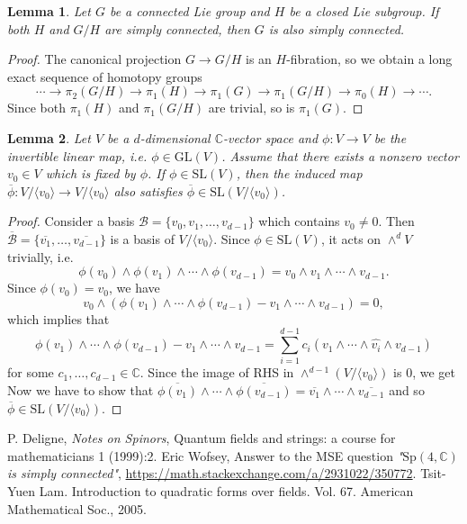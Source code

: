 \documentclass{article}
\newtheorem{lemma}{Lemma}
\newcommand{\SL}{\mathrm{SL}}
\newcommand{\GL}{\mathrm{GL}}
\newcommand{\Sp}{\mathrm{Sp}}
\begin{document}
\begin{lemma}
\label{simply}
Let $G$ be a connected Lie group and $H$ be a closed Lie subgroup. If both $H$ and $G/H$ are simply connected, then $G$ is also simply connected. 
\end{lemma}
\begin{proof}
The canonical projection $G\to G/H$ is an $H$-fibration, so we obtain a long exact sequence of homotopy groups
$$
\cdots \to \pi_{2}(G/H)\to \pi_{1}(H) \to \pi_{1}(G) \to \pi_{1}(G/H) \to \pi_{0}(H) \to \cdots. 
$$
Since both $\pi_{1}(H)$ and $\pi_{1}(G/H)$ are trivial, so is $\pi_{1}(G)$. 
\end{proof}

\begin{lemma}
\label{det}
Let $V$ be a $d$-dimensional $\mathbb{C}$-vector space and $\phi:V\to V$ be the invertible linear map, i.e. $\phi\in \GL(V)$. Assume that there exists a nonzero vector $v_{0}\in V$ which is fixed by $\phi$. 
If $\phi\in \SL(V)$, then the induced map $\overline{\phi}:V/\langle v_{0}\rangle \to V/\langle v_{0}\rangle$ also satisfies $\overline{\phi}\in \SL(V/\langle v_{0}\rangle)$. 
\end{lemma}
\begin{proof}
Consider a basis $\mathcal{B} = \{v_{0}, v_{1}, \dots, v_{d-1}\}$ which contains $v_{0}\neq 0$. 
Then $\overline{\mathcal{B}} = \{\overline{v_{1}}, \dots, \overline{v_{d-1}}\}$ is a basis of $V/\langle v_{0}\rangle$. 
Since $\phi\in \SL(V)$, it acts on $\wedge^{d}V$ trivially, i.e. $$\phi(v_{0})\wedge \phi(v_{1})\wedge \cdots \wedge \phi(v_{d-1}) = v_{0}\wedge v_{1}\wedge \cdots \wedge v_{d-1}.$$
Since $\phi(v_{0}) = v_{0}$,  we have
$$
v_{0}\wedge (\phi(v_{1})\wedge \cdots \wedge \phi(v_{d-1}) - v_{1}\wedge \cdots \wedge v_{d-1}) = 0, 
$$
which implies that 
$$
\phi(v_{1})\wedge\cdots\wedge \phi(v_{d-1}) - v_{1}\wedge\cdots \wedge v_{d-1} = \sum_{i=1}^{d-1}c_{i}(v_{1}\wedge\cdots\wedge\widehat{v_{i}}\wedge v_{d-1})
$$
for some $c_{1}, \dots, c_{d-1}\in \mathbb{C}$. 
Since the image of RHS in $\wedge^{d-1}(V/\langle v_{0}\rangle)$ is 0, we get
Now we have to show that $\overline{\phi(v_{1})}\wedge\cdots\wedge \overline{\phi(v_{d-1})} = \overline{v_{1}}\wedge\cdots\wedge \overline{v_{d-1}}$ and so $\overline{\phi}\in \SL(V/\langle v_{0}\rangle)$.  
\end{proof}


\begin{thebibliography}{5}
P. Deligne, \emph{Notes on Spinors}, Quantum fields and strings: a course for mathematicians 1 (1999):2. 
Eric Wofsey, Answer to the MSE question \emph{"$\Sp(4, \mathbb{C})$ is simply connected"}, \url{https://math.stackexchange.com/a/2931022/350772}. 
Tsit-Yuen Lam. Introduction to quadratic forms over fields. Vol. 67. American Mathematical Soc., 2005.
\end{thebibliography}
\end{document}
